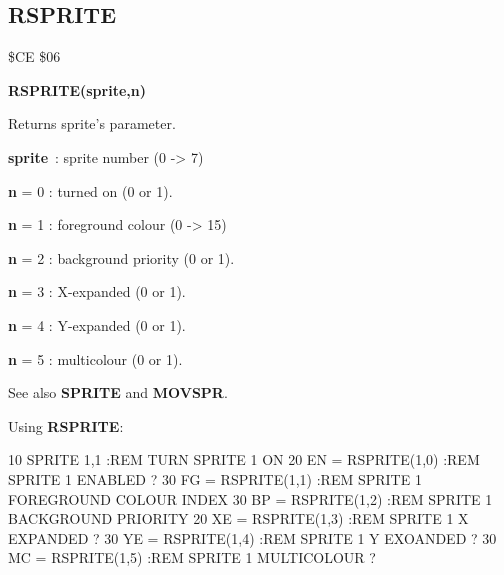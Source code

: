 \subsection{RSPRITE}
\begin{description}[leftmargin=3cm,style=nextline]
\item [Token:] \$CE \$06
\item [Format:] {\bf RSPRITE(sprite,n)} \\
\item [Usage:]  Returns sprite's parameter.

                {\bf sprite} : sprite number (0 -> 7)

                {\bf n} = 0 : turned on (0 or 1).

                {\bf n} = 1 : foreground colour (0 -> 15)

                {\bf n} = 2 : background priority (0 or 1).

                {\bf n} = 3 : X-expanded (0 or 1).

                {\bf n} = 4 : Y-expanded (0 or 1).

                {\bf n} = 5 : multicolour (0 or 1).

\item [Remarks:] See also {\bf SPRITE} and {\bf MOVSPR}.

\item [Example:] Using {\bf RSPRITE}:
\begin{screenoutput}
 10 SPRITE 1,1          :REM TURN SPRITE 1 ON
 20 EN = RSPRITE(1,0)   :REM SPRITE 1 ENABLED ?
 30 FG = RSPRITE(1,1)   :REM SPRITE 1 FOREGROUND COLOUR INDEX
 30 BP = RSPRITE(1,2)   :REM SPRITE 1 BACKGROUND PRIORITY
 20 XE = RSPRITE(1,3)   :REM SPRITE 1 X EXPANDED ?
 30 YE = RSPRITE(1,4)   :REM SPRITE 1 Y EXOANDED ?
 30 MC = RSPRITE(1,5)   :REM SPRITE 1 MULTICOLOUR ?
\end{screenoutput}
\end{description}


\newpage
